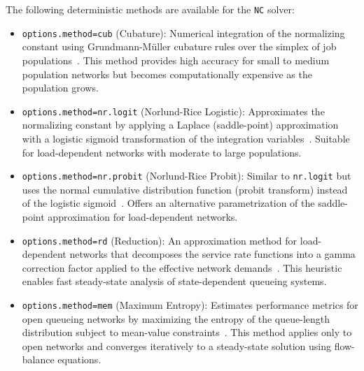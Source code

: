 The following deterministic methods are available for the \texttt{NC} solver:
\begin{itemize}
\item \texttt{options.method=cub} (Cubature): Numerical integration of the normalizing constant using Grundmann-M\"{u}ller cubature rules over the simplex of job populations~\cite{Cas17}. This method provides high accuracy for small to medium population networks but becomes computationally expensive as the population grows.
\item \texttt{options.method=nr.logit} (Norlund-Rice Logistic): Approximates the normalizing constant by applying a Laplace (saddle-point) approximation with a logistic sigmoid transformation of the integration variables~\cite{CasHH21}. Suitable for load-dependent networks with moderate to large populations.
\item \texttt{options.method=nr.probit} (Norlund-Rice Probit): Similar to \texttt{nr.logit} but uses the normal cumulative distribution function (probit transform) instead of the logistic sigmoid~\cite{CasHH21}. Offers an alternative parametrization of the saddle-point approximation for load-dependent networks.
\item \texttt{options.method=rd} (Reduction): An approximation method for load-dependent networks that decomposes the service rate functions into a gamma correction factor applied to the effective network demands~\cite{CasHH21}. This heuristic enables fast steady-state analysis of state-dependent queueing systems.
\item \texttt{options.method=mem} (Maximum Entropy): Estimates performance metrics for open queueing networks by maximizing the entropy of the queue-length distribution subject to mean-value constraints~\cite{Kou94}. This method applies only to open networks and converges iteratively to a steady-state solution using flow-balance equations.
\end{itemize}


